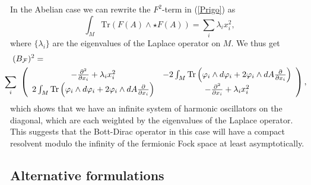 \documentclass[letterpaper,12pt]{article}
\newcommand{\nn}{\nonumber}
\def\cf{{\cal F}}
\newcommand{\pa}{\partial}
\begin{document}
In the Abelian case we can rewrite the $F^2$-term in (\ref{Prigo}) as
$$
\int_M \mbox{Tr}\left( F(A)\wedge \star F(A)\right) = \sum_i \lambda_i x_i^2,
$$
where $\{\lambda_i\}$ are the eigenvalues of the Laplace operator on $M$. We thus get 
\begin{eqnarray}
(B_\cf)^2
&=&
\nn\\
&&\hspace{-2cm}
\sum_i  \ \left(
\begin{array}{cc}
 -\frac{\pa^2}{\pa x_i} +   \lambda_i x_i^2   &  -2 \int_M \mbox{Tr} \left(\varphi_i \wedge d \varphi_i  +2\varphi_i \wedge dA \frac{\pa}{\pa x_i}\right)
\\
2 \int_M \mbox{Tr} \left(\varphi_i \wedge d \varphi_i  +2\varphi_i \wedge dA \frac{\pa}{\pa x_i}\right) &  -\frac{\pa^2}{\pa x_i} +   \lambda_i x_i^2  
\end{array}
\right), \nn\\
\label{WE}
\end{eqnarray}
which shows that we have an infinite system of harmonic oscillators on the diagonal, which are each weighted by the eigenvalues of the Laplace operator. This suggests that the Bott-Dirac operator in this case will have a compact resolvent modulo the infinity of the fermionic Fock space at least asymptotically.












\subsection{Alternative formulations}
\end{document}
